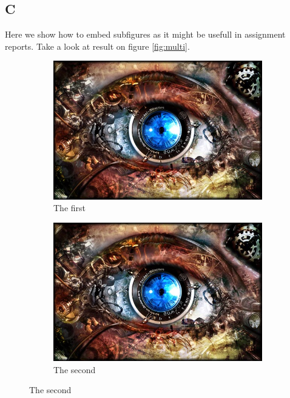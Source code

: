 \documentclass[11pt,a4paper]{article}
\begin{document}
\subsection{C}
Here we show how to embed subfigures as it might be usefull in assignment reports. Take a look at result on figure \ref{fig:multi}.

\begin{figure}[!h] %
    \centering
    \begin{subfigure}[h]{0.3\textwidth}
        \includegraphics[width=\textwidth]{img}
        \caption{The first}
    \end{subfigure}
    \begin{subfigure}[h]{0.3\textwidth}
        \includegraphics[width=\textwidth]{img}
        \caption{The second}
    \end{subfigure}

\end{figure}
\end{document}
